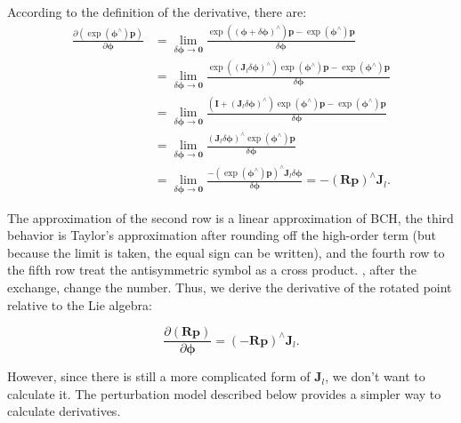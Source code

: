 According to the definition of the derivative, there are:
\begin{align*}
\frac{{\partial \left( {\exp \left( {{ \boldsymbol{\phi} ^ \wedge }} \right) \bm{p}} \right)}}{{\partial \boldsymbol{\phi} }} &= \mathop {\lim }\limits_{\delta \boldsymbol{\phi}  \to \bm{0}} \frac{{\exp \left( {{{\left( {\boldsymbol{\phi}  + \delta \boldsymbol{\phi} } \right)}^ \wedge }} \right) \bm{p} - \exp \left( {{\boldsymbol{\phi} ^ \wedge }} \right)\bm{p}}}{{\delta \boldsymbol{\phi} }}\\
& = \mathop {\lim }\limits_{\delta \boldsymbol{\phi}  \to \bm{0}} \frac{{\exp \left( {{{\left( {{\bm{J}_l}\delta \boldsymbol{\phi} } \right)}^ \wedge }} \right)\exp \left( {{\boldsymbol{\phi} ^ \wedge }} \right) \bm{p} - \exp \left( {{\boldsymbol{\phi} ^ \wedge }} \right) \bm{p}}}{{\delta \boldsymbol{\phi} }}\\
&= \mathop {\lim }\limits_{\delta \boldsymbol{\phi}  \to \bm{0}} \frac{{\left( { \bm{I} + {{\left( {{ \bm{J}_l}\delta \boldsymbol{\phi} } \right)}^ \wedge }} \right)\exp \left( {{\boldsymbol{\phi} ^ \wedge }} \right) \bm{p} - \exp \left( {{\boldsymbol{\phi} ^ \wedge }} \right)\bm{p}}}{{\delta \boldsymbol{\phi} }}\\
&= \mathop {\lim }\limits_{\delta \boldsymbol{\phi}  \to \bm{0}} \frac{{{{\left( {{\bm{J}_l}\delta \boldsymbol{\phi} } \right)}^ \wedge }\exp \left( {{\boldsymbol{\phi} ^ \wedge }} \right)\bm{p}}}{{\delta \boldsymbol{\phi} }}\\
&= \mathop {\lim }\limits_{\delta \boldsymbol{\phi}  \to \bm{0}} \frac{{ - {{\left( {\exp \left( {{\boldsymbol{\phi} ^ \wedge }} \right)\bm{p}} \right)}^ \wedge }{\bm{J}_l}\delta \boldsymbol{\phi} }}{{\delta \boldsymbol{\phi}}} =  - {\left( {\bm{Rp}} \right)^ \wedge }{\bm{J}_l}.
\end{align*}

The approximation of the second row is a linear approximation of BCH, the third behavior is Taylor's approximation after rounding off the high-order term (but because the limit is taken, the equal sign can be written), and the fourth row to the fifth row treat the antisymmetric symbol as a cross product. , after the exchange, change the number. Thus, we derive the derivative of the rotated point relative to the Lie algebra:

\begin{equation}
\frac{{\partial \left( { \bm{Rp}} \right)}}{{\partial \boldsymbol{\phi} }} = {\left( { - \bm{Rp}} \right)^ \wedge }{\bm{J}_l}.
\end{equation}

However, since there is still a more complicated form of $\bm{J}_l$, we don't want to calculate it. The perturbation model described below provides a simpler way to calculate derivatives.